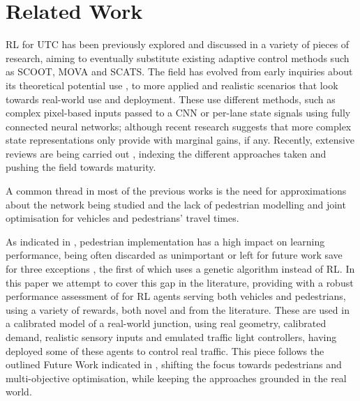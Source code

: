 \documentclass[conference]{IEEEtran}
\begin{document}
\section{Related Work}
\label{lit}
RL for UTC has been previously explored and discussed in a variety of pieces of research, aiming to eventually substitute existing adaptive control methods such as SCOOT\cite{scoot}, MOVA\cite{mova} and SCATS\cite{scats}.
The field has evolved from early inquiries about its theoretical potential use \cite{wiering2000} \cite{abdul2003} \cite{pra2010} \cite{abdulhai2010} \cite{abdoos2011}, to more applied and realistic scenarios \cite{survey2014} \cite{genders2016} \cite{liang2017} \cite{gendersthesis} \cite{gao2017} \cite{mousavi2017} \cite{wan2018} \cite{liang2018} \cite{aslani2019} \cite{genders2019} that look towards real-world use and deployment.
These use different methods, such as complex pixel-based inputs passed to a CNN or per-lane state signals using fully connected neural networks; although recent research suggests that more complex state representations only provide with marginal gains, if any\cite{gendersstate}.
Recently, extensive reviews are being carried out \cite{mannion} \cite{survey2020} \cite{survey2020wei}, indexing the different approaches taken and pushing the field towards maturity.

A common thread in most of the previous works is the need for approximations about the network being studied and the lack of pedestrian modelling and joint optimisation for vehicles and pedestrians' travel times.

As indicated in \cite{survey2020}, pedestrian implementation has a high impact on learning performance, being often discarded as unimportant or left for future work save for three exceptions \cite{geneticped} \cite{liu2017} \cite{chen2020}, the first of which uses a genetic algorithm instead of RL.
In this paper we attempt to cover this gap in the literature, providing with a robust performance assessment of for RL agents serving both vehicles and pedestrians, using a variety of rewards, both novel and from the literature.
These are used in a calibrated model of a real-world junction, using real geometry, calibrated demand, realistic sensory inputs and emulated traffic light controllers, having deployed some of these agents to control real traffic.
This piece follows the outlined Future Work indicated in \cite{previous}, shifting the focus towards pedestrians and multi-objective optimisation, while keeping the approaches grounded in the real world.
\end{document}
